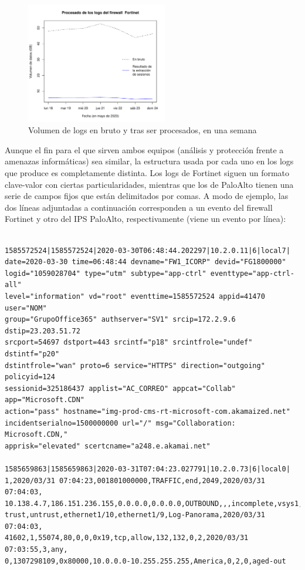 \begin{figure}[h]
    \centering
    \includegraphics[width=0.55\textwidth]{contenido/fig/volumen_logs.pdf}
    \caption{Volumen de logs en bruto y tras ser procesados, en una semana}
    \label{fig:volumenlogs}
\end{figure}

Aunque el fin para el que sirven ambos equipos (análisis y protección frente a amenazas informáticas) sea similar,
la estructura usada por cada uno en los logs que produce es completamente distinta.
Los logs de Fortinet siguen un formato clave-valor con ciertas particularidades, mientras que los de PaloAlto tienen una serie de campos fijos que están delimitados por comas.
A modo de ejemplo, las dos líneas adjuntadas a continuación corresponden a un evento del firewall Fortinet y otro del IPS PaloAlto, respectivamente (viene un evento por línea):

\begingroup
\makeatletter
\@totalleftmargin=-1cm
\begin{verbatim}

1585572524|1585572524|2020-03-30T06:48:44.202297|10.2.0.11|6|local7|
date=2020-03-30 time=06:48:44 devname="FW1_ICORP" devid="FG1800000"
logid="1059028704" type="utm" subtype="app-ctrl" eventtype="app-ctrl-all"
level="information" vd="root" eventtime=1585572524 appid=41470 user="NOM"
group="GrupoOffice365" authserver="SV1" srcip=172.2.9.6 dstip=23.203.51.72
srcport=54697 dstport=443 srcintf="p18" srcintfrole="undef" dstintf="p20"
dstintfrole="wan" proto=6 service="HTTPS" direction="outgoing" policyid=124
sessionid=325186437 applist="AC_CORREO" appcat="Collab" app="Microsoft.CDN"
action="pass" hostname="img-prod-cms-rt-microsoft-com.akamaized.net"
incidentserialno=1500000000 url="/" msg="Collaboration: Microsoft.CDN,"
apprisk="elevated" scertcname="a248.e.akamai.net"

1585659863|1585659863|2020-03-31T07:04:23.027791|10.2.0.73|6|local0|
1,2020/03/31 07:04:23,001801000000,TRAFFIC,end,2049,2020/03/31 07:04:03,
10.138.4.7,186.151.236.155,0.0.0.0,0.0.0.0,OUTBOUND,,,incomplete,vsys1,
trust,untrust,ethernet1/10,ethernet1/9,Log-Panorama,2020/03/31 07:04:03,
41602,1,55074,80,0,0,0x19,tcp,allow,132,132,0,2,2020/03/31 07:03:55,3,any,
0,1307298109,0x80000,10.0.0.0-10.255.255.255,America,0,2,0,aged-out

\end{verbatim}
\endgroup

